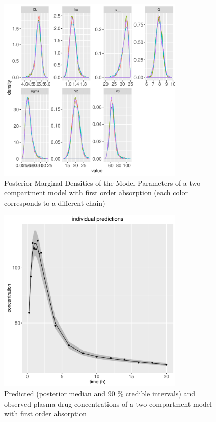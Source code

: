 \documentclass[11pt]{amsart}
\begin{document}
\begin{figure}[htbp]
\begin{center}
\includegraphics[width=3.5in,trim=0in 0in 0 0in]{graphics/TwoCptModelExamplePlots004.pdf}
\caption{{Posterior Marginal Densities of the Model Parameters of a two compartment model with first order absorption (each color corresponds to a different chain)}}
\label{TwoCptDensity}
\end{center}
\end{figure}

\begin{figure}[htbp]
\begin{center}
\includegraphics[width=3.5in,trim=0in 0in 0 0in]{graphics/TwoCptModelExamplePlots006.pdf}
\caption{{Predicted (posterior median and 90 \% credible intervals) and observed plasma drug concentrations of a two compartment model with first order absorption}}
\label{TwoCptPredictions}
\end{center}
\end{figure}
\end{document}
